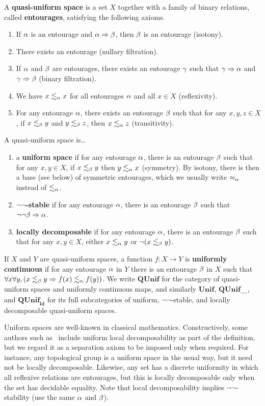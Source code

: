 \documentclass{article}
\def\leapx{\lesssim}
\def\ent#1{\leapx_{#1}}
\let\implies\Rightarrow
\def\nn{\ensuremath{\neg\neg}}
\def\QUnif{\mathbf{QUnif}}
\def\Unif{\mathbf{Unif}}
\def\QUnifnn{\mathbf{QUnif}_{\nn}}
\def\ldQUnif{\mathbf{QUnif}_{\mathbf{ld}}}
\begin{document}
\begin{defn}
  A \textbf{quasi-uniform space} is a set $X$ together with a family of binary relations, called \textbf{entourages}, satisfying the following axioms.
  \begin{enumerate}
  \item If $\alpha$ is an entourage and $\al\implies\be$, then $\beta$ is an entourage (isotony).
  \item There exists an entourage (nullary filtration).
  \item If $\alpha$ and $\beta$ are entourages, there exists an entourage $\gamma$ such that $\gm\implies\al$ and $\gm\implies\be$ (binary filtration).
  \item We have $x\ent\al x$ for all entourages $\alpha$ and all $x\in X$ (reflexivity).
  \item For any entourage $\alpha$, there exists an entourage $\beta$ such that for any $x,y,z\in X$, if $x\ent\be y$ and $y\ent\be z$, then $x\ent\al z$ (transitivity).
  \end{enumerate}
  A quasi-uniform space is\dots
  \begin{enumerate}[resume]
  \item a \textbf{uniform space} if for any entourage $\alpha$, there is an entourage $\beta$ such that for any $x,y\in X$, if $x\ent\be y$ then $y\ent\al x$ (symmetry).
    By isotony, there is then a base (see below) of symmetric entourages, which we usually write $\approx_\alpha$ instead of $\ent\al$.
  \item \textbf{\nn-stable} if for any entourage $\alpha$, there is an entourage $\beta$ such that $\neg\neg\be\implies \al$.
  \item \textbf{locally decomposable} if for any entourage $\alpha$, there is an entourage $\beta$ such that for any $x,y\in X$, either $x\ent\al y$ or $\neg(x\ent\be y)$.
  \end{enumerate}
  If $X$ and $Y$ are quasi-uniform spaces, a function $f:X\to Y$ is \textbf{uniformly continuous} if for any entourage $\alpha$ in $Y$ there is an entourage $\beta$ in $X$ such that $\forall x\forall y, (x\ent\be y \implies f(x)\ent\al f(y))$.
  We write $\QUnif$ for the category of quasi-uniform spaces and uniformly continuous maps, and similarly
  $\Unif$, $\QUnifnn$, and $\ldQUnif$ for its full subcategories of uniform, \nn-stable,
  and locally decomposable quasi-uniform spaces.
\end{defn}

Uniform spaces are well-known in classical mathematics.
Constructively, some authors such as~\cite{bridges-vita} include uniform local decomposability as part of the definition, but we regard it as a separation axiom to be imposed only when required.
For instance, any topological group is a uniform space in the usual way, but it need not be locally decomposable.
Likewise, any set has a discrete uniformity in which all reflexive relations are entourages, but this is locally decomposable only when the set has decidable equality.
Note that local decomposability implies \nn-stability (use the same $\alpha$ and $\beta$).
\end{document}
